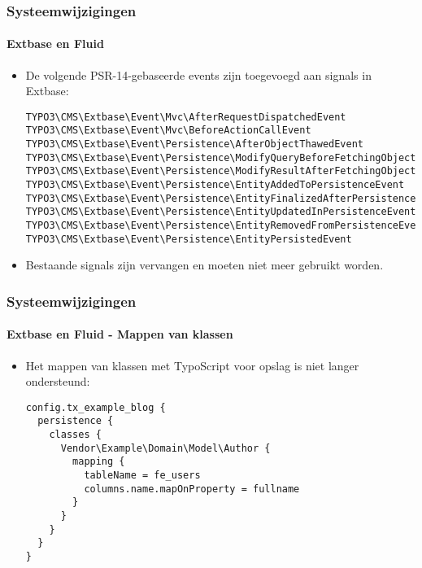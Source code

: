
\begin{frame}[fragile]
	\frametitle{Systeemwijzigingen}
	\framesubtitle{Extbase en Fluid}

	\lstset{basicstyle=\tiny\ttfamily}

	\begin{itemize}
		\item De volgende PSR-14-gebaseerde events zijn toegevoegd aan signals in Extbase:
\begin{lstlisting}
TYPO3\CMS\Extbase\Event\Mvc\AfterRequestDispatchedEvent
TYPO3\CMS\Extbase\Event\Mvc\BeforeActionCallEvent
TYPO3\CMS\Extbase\Event\Persistence\AfterObjectThawedEvent
TYPO3\CMS\Extbase\Event\Persistence\ModifyQueryBeforeFetchingObjectDataEvent
TYPO3\CMS\Extbase\Event\Persistence\ModifyResultAfterFetchingObjectDataEvent
TYPO3\CMS\Extbase\Event\Persistence\EntityAddedToPersistenceEvent
TYPO3\CMS\Extbase\Event\Persistence\EntityFinalizedAfterPersistenceEvent
TYPO3\CMS\Extbase\Event\Persistence\EntityUpdatedInPersistenceEvent
TYPO3\CMS\Extbase\Event\Persistence\EntityRemovedFromPersistenceEvent
TYPO3\CMS\Extbase\Event\Persistence\EntityPersistedEvent
\end{lstlisting}

		\item Bestaande signals zijn vervangen en moeten niet meer gebruikt worden.

	\end{itemize}

\end{frame}


\begin{frame}[fragile]
	\frametitle{Systeemwijzigingen}
	\framesubtitle{Extbase en Fluid - Mappen van klassen}

	\lstset{basicstyle=\tiny\ttfamily}

	\begin{itemize}
		\item Het mappen van klassen met TypoScript voor opslag is niet langer ondersteund:
\begin{lstlisting}
config.tx_example_blog {
  persistence {
    classes {
      Vendor\Example\Domain\Model\Author {
        mapping {
          tableName = fe_users
          columns.name.mapOnProperty = fullname
        }
      }
    }
  }
}
\end{lstlisting}

	\end{itemize}

\end{frame}


